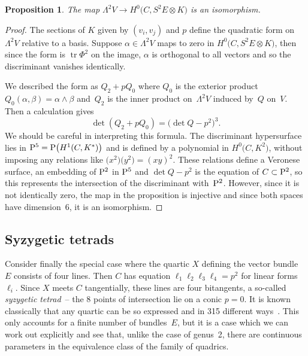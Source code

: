 \documentclass[10pt,a4paper]{amsart}
\numberwithin{equation}{section}
\newtheorem{Proposition}[Theorem]{Proposition}
 { \theoremstyle{definition}
\newtheorem{Remark}[Theorem]{Remark} }
\begin{document}
\begin{Proposition} The map $\Lambda^2V\rightarrow H^0\big(C, S^2E\otimes K\big)$ is an isomorphism.
\end{Proposition}
\begin{proof} The sections of $K$ given by $(v_i,v_j)$ and $p$ define the quadratic form on $\Lambda^2V$ relative to a basis. Suppose $\alpha\in \Lambda^2V$ maps to zero
in $H^0\big(C, S^2E\otimes K\big)$, then since the form is $\operatorname{tr} \Phi^2$ on the image, $\alpha$ is orthogonal to all vectors and so the discriminant vanishes identically.

We described the form as $Q_2+pQ_0$ where $Q_0$ is the exterior product $Q_0(\alpha,\beta)=\alpha\wedge\beta$ and~$Q_2$ is the inner product on~$\Lambda^2V$ induced by~$Q$ on~$V$. Then a calculation gives
\begin{equation*}
\det (Q_2+pQ_0)=\big(\det Q-p^2\big)^3.
\end{equation*}
We should be careful in interpreting this formula. The discriminant hypersurface lies in $\mathrm{P}^5={\rm P}\big(H^1(C,K^{*})\big)$ and is defined by a polynomial in $H^0\big(C,K^2\big)$, without imposing any relations like $\big(x^2\big)\big(y^2\big)=(xy)^2$. These relations define a Veronese surface, an embedding of ${\rm P}^2$ in ${\rm P}^5$ and $\det Q-p^2$ is the equation of $C\subset {\rm P}^2$, so this represents the intersection of the discriminant with~${\rm P}^2$. However, since it is not identically zero, the map in the proposition is injective and since both spaces have dimension~$6$, it is an isomorphism.
\end{proof}

 \subsection{Syzygetic tetrads}
 Consider finally the special case where the quartic $X$ defining the vector bundle $E$ consists of four lines. Then $C$ has equation $\ell_1\ell_2\ell_3\ell_4=p^2$ for linear forms $\ell_i$. Since $X$ meets $C$ tangentially, these lines are four bitangents, a so-called {\it syzygetic tetrad}~-- the 8 points of intersection lie on a conic $p=0$.
 It is known classically that any quartic can be so expressed and in 315 different ways~\cite{Dolgachev}. This only accounts for a finite number of bundles~$E$, but it is a case which we can work out explicitly and see that, unlike the case of genus~2, there are continuous parameters in the equivalence class of the family of quadrics.
\end{document}
